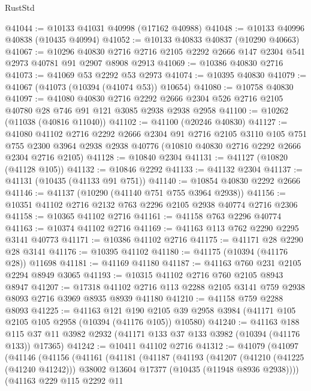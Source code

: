 \begin{lexlean}{RustStd}
\begin{coremodule}
@41044 := @10133 @41031 @40998 (@17162 @40988)
@41048 := @10133 @40996 @40838 (@10435 @40994)
@41052 := @10133 @40833 @40837 (@10290 @40663)
@41067 := @10296
    @40830
    @2716
    @2716
    @2105
    @2292
    @2666
    @147
    @2304
    @541
    @2973
    @40781
    @91
    @2907
    @8908
    @2913
@41069 := @10386 @40830 @2716
@41073 := @41069 @53 @2292 @53 @2973
@41074 := @10395 @40830
@41079 := @41067 (@41073 (@10394 (@41074 @53)) @10654)
@41080 := @10758 @40830
@41097 := @41080
    @40830
    @2716
    @2292
    @2666
    @2304
    @526
    @2716
    @2105
    @40780
    @28
    @746
    @91
    @121
    @3085
    @2938
    @2938
    @2958
@41100 := @10262 (@11038 (@40816 @11040))
@41102 := @41100 (@20246 @40830)
@41127 := @41080
    @41102
    @2716
    @2292
    @2666
    @2304
    @91
    @2716
    @2105
    @3110
    @105
    @751
    @755
    @2300
    @3964
    @2938
    @2938
    @40776
    (@10810 @40830 @2716 @2292 @2666 @2304 @2716 @2105)
@41128 := @10840 @2304
@41131 := @41127 (@10820 (@41128 @105))
@41132 := @10846 @2292
@41133 := @41132 @2304
@41137 := @41131 (@10435 (@41133 @91 @751))
@41140 := @10854 @40830 @2292 @2666
@41146 := @41137 (@10290 (@41140 @751 @755 @3964 @2938))
@41156 := @10351 @41102 @2716 @2132 @763 @2296 @2105 @2938 @40774 @2716 @2306
@41158 := @10365 @41102 @2716
@41161 := @41158 @763 @2296 @40774
@41163 := @10374 @41102 @2716
@41169 := @41163 @113 @762 @2290 @2295 @3141 @40773
@41171 := @10386 @41102 @2716
@41175 := @41171 @28 @2290 @28 @3141
@41176 := @10395 @41102
@41180 := @41175 (@10394 (@41176 @28)) @11698
@41181 := @41169 @41180
@41187 := @41163 @760 @231 @2105 @2294 @8949 @3065
@41193 := @10315 @41102 @2716 @760 @2105 @8943 @8947
@41207 := @17318 @41102 @2716 @113 @2288 @2105 @3141 @759 @2938 @8093 @2716 @3969 @8935 @8939 @41180
@41210 := @41158 @759 @2288 @8093
@41225 := @41163
    @121
    @190
    @2105
    @39
    @2958
    @3984
    (@41171 @105 @2105 @105 @2958 (@10394 (@41176 @105)) @10580)
@41240 := @41163
    @188
    @115
    @37
    @11
    @3982
    @2932
    (@41171 @133 @37 @133 @3982 (@10394 (@41176 @133)) @17365)
@41242 := @10411 @41102 @2716
@41312 := @41079
    (@41097
      (@41146
        (@41156
          (@41161
            (@41181
              (@41187
                (@41193
                  (@41207
                    (@41210 (@41225 (@41240 @41242)))
                    @38002
                    @13604
                    @17377
                    (@10435 (@11948 @8936 @2938))))
                (@41163
                  @229
                  @115
                  @2292
                  @11

\end{coremodule}
\end{lexlean}
